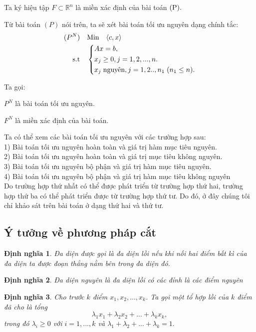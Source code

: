 \documentclass[12pt,a4paper]{report}
\newtheorem{dn}{Định nghĩa}
\begin{document}
  Ta ký hiệu tập $ F \subset \mathbb R^n$ là miền xác định của bài toán ${\rm (P)}.$

Từ bài toán $(P)$ nói trên, ta sẽ xét bài toán tối ưu nguyên dạng chính tắc:
\begin{equation}\label{BTNchinhtac}
     \begin{split}
         {(P^N)} & \quad {\rm Min}  \quad\langle c,x \rangle\\
          \rm{s.t} &\quad \left\{\begin{split}
            & Ax= b,\\
           & x_j \ge 0, j=1,2,...,n.\\
            & x_j \hspace{0.1cm} \text{nguyên}, j=1,2..,n_1\hspace{0.1cm}(n_1\le n).\\
           \end{split}\right.
       \end{split}
   \end{equation}
   
   Ta gọi:
   
   $P^N$ là bài toán tối ưu nguyên.
   
$F^N$ là miền xác định của bài toán.

   Ta có thể xem các bài toán tối ưu nguyên với các trường hợp sau:\\
   1) Bài toán tối ưu nguyên hoàn toàn và giá trị hàm mục tiêu nguyên.\\
   2) Bài toán tối ưu nguyên hoàn toàn và giá trị mục tiêu không nguyên.\\
   3) Bài toán tối ưu nguyên bộ phận và giá trị hàm mục tiêu nguyên.\\
   4) Bài toán tối ưu nguyên bộ phận và giá trị hàm mục tiêu không nguyên\\
   Do trường hợp thứ nhất có thể được phát triển từ trường hợp thứ hai, trường hợp thứ ba có thể phát triển được từ trường hợp thứ tư. Do đó, ở đây chúng tôi chỉ khảo sát trên bài toán ở dạng thứ hai và thứ tư.\\
\subsection{ Ý tưởng về phương pháp cắt}

\begin{dn}
    Đa diện được gọi là đa diện lồi nếu khi nối hai điểm bất kì của đa diện ta được đoạn thẳng nằm bên trong đa diện đó.
\end{dn}
\begin{dn}
    Đa diện nguyên là đa diện lồi có các đỉnh là các điểm nguyên
\end{dn}
\begin{dn}
	Cho trước $k$ điểm ${x_1},{x_2},...,{x_k}$. Ta gọi một tổ hợp lồi của $k$ điểm đã cho là tổng
	$${\lambda _1}{x_1} + {\lambda _2}{x_2} + ... + {\lambda _k}{x_k},$$
 trong đó ${\lambda _i} \ge 0$ với $i=1,...,k$ và ${\lambda _1} + {\lambda _2} + ... + {\lambda _k} = 1.$
\end{dn}
\end{document}
